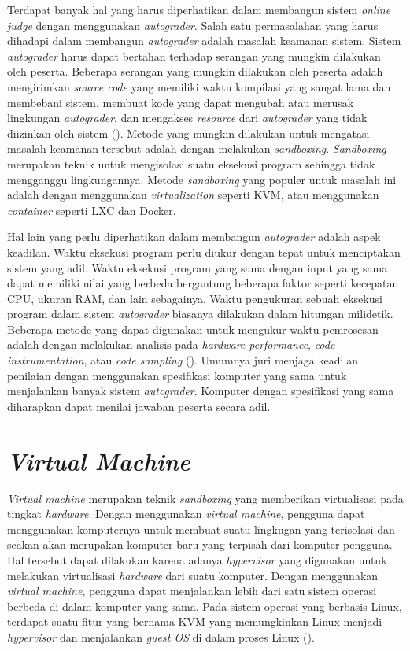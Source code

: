 \par Terdapat banyak hal yang harus diperhatikan dalam membangun sistem \textit{online judge} dengan menggunakan \textit{autograder}. Salah satu permasalahan yang harus dihadapi dalam membangun \textit{autograder} adalah masalah keamanan sistem. Sistem \textit{autograder} harus dapat bertahan terhadap serangan yang mungkin dilakukan oleh peserta. Beberapa serangan yang mungkin dilakukan oleh peserta adalah mengirimkan \textit{source code} yang memiliki waktu kompilasi yang sangat lama dan membebani sistem, membuat kode yang dapat mengubah atau merusak lingkungan \textit{autograder}, dan mengakses \textit{resource} dari \textit{autograder} yang tidak diizinkan oleh sistem (\cite{wasikojsurvey}). Metode yang mungkin dilakukan untuk mengatasi masalah keamanan tersebut adalah dengan melakukan \textit{sandboxing}. \textit{Sandboxing} merupakan teknik untuk mengisolasi suatu eksekusi program sehingga tidak mengganggu lingkungannya. Metode \textit{sandboxing} yang populer untuk masalah ini adalah dengan menggunakan \textit{virtualization} seperti KVM, atau menggunakan \textit{container} seperti LXC dan Docker.

\par Hal lain yang perlu diperhatikan dalam membangun \textit{autograder} adalah aspek keadilan. Waktu eksekusi program perlu diukur dengan tepat untuk menciptakan sistem yang adil. Waktu eksekusi program yang sama dengan input yang sama dapat memiliki nilai yang berbeda bergantung beberapa faktor seperti kecepatan CPU, ukuran RAM, dan lain sebagainya. Waktu pengukuran sebuah eksekusi program dalam sistem \textit{autograder} biasanya dilakukan dalam hitungan milidetik. Beberapa metode yang dapat digunakan untuk mengukur waktu pemrosesan adalah dengan melakukan analisis pada \textit{hardware performance}, \textit{code instrumentation}, atau \textit{code sampling} (\cite{wasikojsurvey}). Umumnya juri menjaga keadilan penilaian dengan menggunakan spesifikasi komputer yang sama untuk menjalankan banyak sistem \textit{autograder}. Komputer dengan spesifikasi yang sama diharapkan dapat menilai jawaban peserta secara adil.

\section{\textit{Virtual Machine}}

\par \textit{Virtual machine} merupakan teknik \textit{sandboxing} yang memberikan virtualisasi pada tingkat \textit{hardware}. Dengan menggunakan \textit{virtual machine}, pengguna dapat menggunakan komputernya untuk membuat suatu lingkugan yang terisolasi dan seakan-akan merupakan komputer baru yang terpisah dari komputer pengguna. Hal tersebut dapat dilakukan karena adanya \textit{hypervisor} yang digunakan untuk melakukan virtualisasi \textit{hardware} dari suatu komputer. Dengan menggunakan \textit{virtual machine}, pengguna dapat menjalankan lebih dari satu sistem operasi berbeda di dalam komputer yang sama. Pada sistem operasi yang berbasis Linux, terdapat suatu fitur yang bernama KVM yang memungkinkan Linux menjadi \textit{hypervisor} dan menjalankan \textit{guest OS} di dalam proses Linux (\cite{wfeltervmcontainer}).

